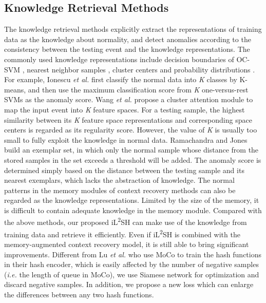 \documentclass[lettersize,journal]{IEEEtran}
\begin{document}
\subsection{Knowledge Retrieval Methods}
The knowledge retrieval methods explicitly extract the representations of training data as the knowledge about normality, and detect anomalies according to the consistency between the testing event and the knowledge representations.
The commonly used knowledge representations include decision boundaries of OC-SVM \cite{DeepAppearance2017smeureanu, ObjectCentricAutoEncoders2019ionescua, LearningDeep2015xua}, nearest neighbor samples \cite{VideoAnomaly2012saligramaa, StreetScene2020ramachandraa}, cluster centers \cite{DetectingAbnormal2019ionescua, ClusterAttention2020wanga, GraphEmbedded2020markovitza, ClusteringDriven2020chang} and probability distributions \cite{GaussianProcess2015cheng, VideoAnomaly2020fana}.
For example, Ionescu \textit{et al.} \cite{ObjectCentricAutoEncoders2019ionescua} first classify the normal data into \textit{K} classes by K-means, and then use the maximum classification score from \textit{K} one-versus-rest SVMs as the anomaly score.
Wang \textit{et al.} \cite{ClusterAttention2020wanga} propose a cluster attention module to map the input event into \textit{K} feature spaces.
For a testing sample, the highest similarity between its \textit{K} feature space representations and corresponding space centers is regarded as its regularity score.
However, the value of \textit{K} is usually too small to fully exploit the knowledge in normal data.
Ramachandra and Jones \cite{StreetScene2020ramachandraa} build an exemplar set, in which only the normal sample whose distance from the stored samples in the set exceeds a threshold will be added.
The anomaly score is determined simply based on the distance between the testing sample and its nearest exemplars, which lacks the abstraction of knowledge.
The normal patterns in the memory modules of context recovery methods \cite{MemorizingNormality2019gonga, LearningMemoryGuided2020parka, LearningNormal2021lva, HybridVideo2021liua, AppearanceMotionMemory2021caia} can also be regarded as the knowledge representations.
Limited by the size of the memory, it is difficult to contain adequate knowledge in the memory module.
Compared with the above methods, our proposed iL\textsuperscript{2}SH can make use of the knowledge from training data and retrieve it efficiently.
Even if iL\textsuperscript{2}SH is combined with the memory-augmented context recovery model, it is still able to bring significant improvements.
Different from Lu \textit{et al.} \cite{LearnableLocalitySensitive2021lu} who use MoCo \cite{MomentumContrast2020he} to train the hash functions in their hash encoder, which is easily affected by the number of negative samples (\textit{i.e.} the length of queue in MoCo), we use Siamese network for optimization and discard negative samples. In addition, we propose a new loss which can enlarge the differences between any two hash functions.
\end{document}
